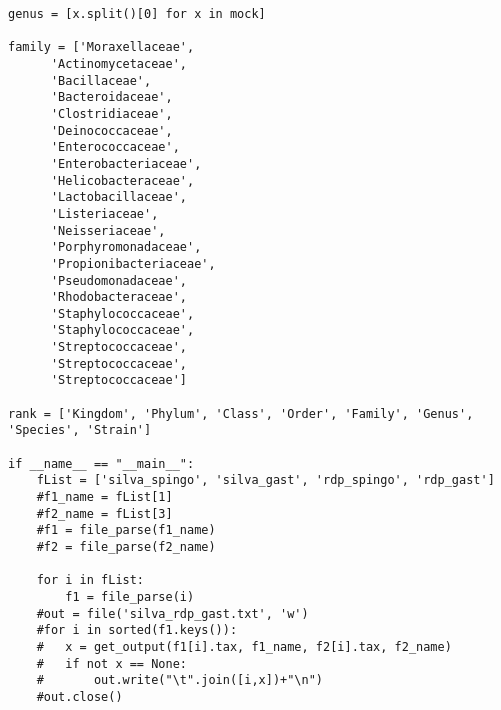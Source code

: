 \begin{verbatim}
genus = [x.split()[0] for x in mock]

family = ['Moraxellaceae',
	  'Actinomycetaceae',
	  'Bacillaceae',
	  'Bacteroidaceae',
	  'Clostridiaceae',
	  'Deinococcaceae',
	  'Enterococcaceae',
	  'Enterobacteriaceae',
	  'Helicobacteraceae',
	  'Lactobacillaceae',
	  'Listeriaceae',
	  'Neisseriaceae',
	  'Porphyromonadaceae',
	  'Propionibacteriaceae',
	  'Pseudomonadaceae',
	  'Rhodobacteraceae',
	  'Staphylococcaceae',
	  'Staphylococcaceae',
	  'Streptococcaceae',
	  'Streptococcaceae',
	  'Streptococcaceae']

rank = ['Kingdom', 'Phylum', 'Class', 'Order', 'Family', 'Genus', 'Species', 'Strain']

if __name__ == "__main__":
	fList = ['silva_spingo', 'silva_gast', 'rdp_spingo', 'rdp_gast']
	#f1_name = fList[1]
	#f2_name = fList[3]
	#f1 = file_parse(f1_name)
	#f2 = file_parse(f2_name)

	for i in fList:
		f1 = file_parse(i)
	#out = file('silva_rdp_gast.txt', 'w')
	#for i in sorted(f1.keys()):
	#	x = get_output(f1[i].tax, f1_name, f2[i].tax, f2_name)
	#	if not x == None:
	#		out.write("\t".join([i,x])+"\n")
	#out.close()
\end{verbatim}

